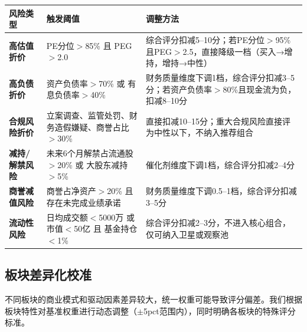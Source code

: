 \begin{exhibitbox}[表8B-3：六大风险调整因子与调整方法]
\centering
\small
\setlength{\tabcolsep}{3pt}
\begin{tabularx}{\linewidth}{L{2.6cm} L{3.8cm} X}
\toprule
\textbf{风险类型} & \textbf{触发阈值} & \textbf{调整方法} \\
\midrule
{}
\textbf{高估值折价} & PE分位$>$85\% 且 PEG$>$2.0 & 综合评分扣减5--10分；若PE分位$>$95\%且PEG$>$2.5，直接降级一档（买入→增持，增持→中性） \\
\hline
{}
\textbf{高负债折价} & 资产负债率$>$70\% 或 有息负债率$>$40\% & 财务质量维度下调1档，综合评分扣减3--5分；若资产负债率$>$80\%且现金流为负，扣减8--10分 \\
\hline
{}
\textbf{合规风险折价} & 立案调查、监管处罚、财务造假嫌疑、商誉占比$>$30\% & 直接扣减10--15分；重大合规风险直接评为中性以下，不纳入推荐组合 \\
\hline
{}
\textbf{减持/解禁风险} & 未来6个月解禁占流通股$>$20\% 或 大股东减持$>$5\% & 催化剂维度下调1档，综合评分扣减2--4分 \\
\hline
{}
\textbf{商誉减值风险} & 商誉占净资产$>$20\% 且 存在未完成业绩承诺 & 财务质量维度下调0.5--1档，综合评分扣减3--5分 \\
\hline
{}
\textbf{流动性风险} & 日均成交额$<$5000万 或 市值$<$50亿 且 基金持仓$<$1\% & 综合评分扣减2--3分，不进入核心组合，仅可纳入卫星或观察池 \\
\bottomrule
\end{tabularx}
\end{exhibitbox}

\subsection{板块差异化校准}

不同板块的商业模式和驱动因素差异较大，统一权重可能导致评分偏差。我们根据板块特性对基准权重进行动态调整（$\pm$5pct范围内），同时明确各板块的特殊评分标准。

